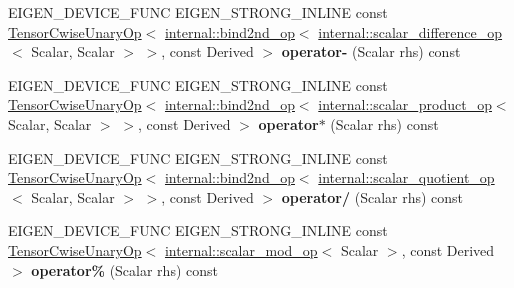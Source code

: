 \begin{DoxyCompactItemize}
\item 
\mbox{\label{class_eigen_1_1_tensor_base_3_01_derived_00_01_read_only_accessors_01_4_a19991dd37d533f6856c6ad5cb380a3ed}} 
E\+I\+G\+E\+N\+\_\+\+D\+E\+V\+I\+C\+E\+\_\+\+F\+U\+NC E\+I\+G\+E\+N\+\_\+\+S\+T\+R\+O\+N\+G\+\_\+\+I\+N\+L\+I\+NE const \hyperlink{class_eigen_1_1_tensor_cwise_unary_op}{Tensor\+Cwise\+Unary\+Op}$<$ \hyperlink{struct_eigen_1_1internal_1_1bind2nd__op}{internal\+::bind2nd\+\_\+op}$<$ \hyperlink{struct_eigen_1_1internal_1_1scalar__difference__op}{internal\+::scalar\+\_\+difference\+\_\+op}$<$ Scalar, Scalar $>$ $>$, const Derived $>$ {\bfseries operator-\/} (Scalar rhs) const
\item 
\mbox{\label{class_eigen_1_1_tensor_base_3_01_derived_00_01_read_only_accessors_01_4_a7906052a9579bfc682ce9840ef6d2e80}} 
E\+I\+G\+E\+N\+\_\+\+D\+E\+V\+I\+C\+E\+\_\+\+F\+U\+NC E\+I\+G\+E\+N\+\_\+\+S\+T\+R\+O\+N\+G\+\_\+\+I\+N\+L\+I\+NE const \hyperlink{class_eigen_1_1_tensor_cwise_unary_op}{Tensor\+Cwise\+Unary\+Op}$<$ \hyperlink{struct_eigen_1_1internal_1_1bind2nd__op}{internal\+::bind2nd\+\_\+op}$<$ \hyperlink{struct_eigen_1_1internal_1_1scalar__product__op}{internal\+::scalar\+\_\+product\+\_\+op}$<$ Scalar, Scalar $>$ $>$, const Derived $>$ {\bfseries operator$\ast$} (Scalar rhs) const
\item 
\mbox{\label{class_eigen_1_1_tensor_base_3_01_derived_00_01_read_only_accessors_01_4_ad03d03be1b8555a9026fbfb746f1a1fd}} 
E\+I\+G\+E\+N\+\_\+\+D\+E\+V\+I\+C\+E\+\_\+\+F\+U\+NC E\+I\+G\+E\+N\+\_\+\+S\+T\+R\+O\+N\+G\+\_\+\+I\+N\+L\+I\+NE const \hyperlink{class_eigen_1_1_tensor_cwise_unary_op}{Tensor\+Cwise\+Unary\+Op}$<$ \hyperlink{struct_eigen_1_1internal_1_1bind2nd__op}{internal\+::bind2nd\+\_\+op}$<$ \hyperlink{struct_eigen_1_1internal_1_1scalar__quotient__op}{internal\+::scalar\+\_\+quotient\+\_\+op}$<$ Scalar, Scalar $>$ $>$, const Derived $>$ {\bfseries operator/} (Scalar rhs) const
\item 
\mbox{\label{class_eigen_1_1_tensor_base_3_01_derived_00_01_read_only_accessors_01_4_af116c9bf46993767d5e3a205b73fd9ff}} 
E\+I\+G\+E\+N\+\_\+\+D\+E\+V\+I\+C\+E\+\_\+\+F\+U\+NC E\+I\+G\+E\+N\+\_\+\+S\+T\+R\+O\+N\+G\+\_\+\+I\+N\+L\+I\+NE const \hyperlink{class_eigen_1_1_tensor_cwise_unary_op}{Tensor\+Cwise\+Unary\+Op}$<$ \hyperlink{struct_eigen_1_1internal_1_1scalar__mod__op}{internal\+::scalar\+\_\+mod\+\_\+op}$<$ Scalar $>$, const Derived $>$ {\bfseries operator\%} (Scalar rhs) const

\end{DoxyCompactItemize}
